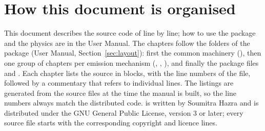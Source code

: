 \documentclass[11pt,a4paper,oneside]{book}
\begin{document}
\chapter*{How this document is organised}
This document describes the source code of  line by line; how to use the package and the physics are in the User Manual. The chapters follow the folders of the package (User Manual, Section~\ref{sec:layout}): first the
common machinery (), then one group of chapters per emission
mechanism (, , ), and finally
the package files  and . Each chapter lists the
source in blocks, with the line numbers of the file, followed by a commentary that refers
to individual lines. The listings are generated from the source files at the time the
manual is built, so the line numbers always match the distributed code.  is written by Soumitra Hazra and is
distributed under the GNU General Public License, version 3 or later; every source file
starts with the corresponding copyright and licence lines.

\end{document}
